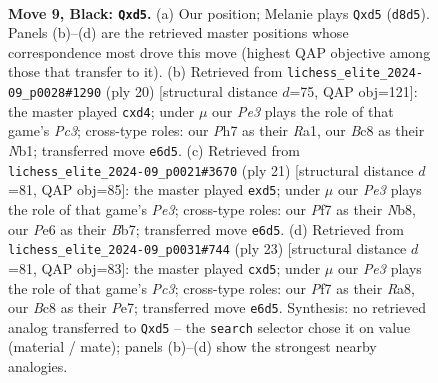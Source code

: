 \documentclass[11pt]{article}
\begin{document}
\clearpage

\begin{figure}[p]\centering
\begin{subfigure}{0.46\textwidth}\centering
\resizebox{\linewidth}{!}{%
\newchessgame
\chessboard[
  setfen={rnbq1rk1/pp3ppp/4p3/2pP3n/3P4/2PBPN2/P4PPP/R1BQ1RK1 b - - 0 9},
  showmover=false,
  pgfstyle=straightmove, color=movearrow, markmove={d8-d5}
]}
\caption{}
\end{subfigure}\hfill
\begin{subfigure}{0.46\textwidth}\centering
\resizebox{\linewidth}{!}{%
\newchessgame
\chessboard[
  setfen={r1bq1rk1/p3p1bp/2pp2pn/4Pp2/3p4/2P2N1P/PP3PP1/RNBQR1K1 w - - 0 11},
  showmover=false,
  pgfstyle=straightmove, color=movearrow, markmove={c3-d4}
]}
\caption{}
\end{subfigure}
\\[4pt]
\begin{subfigure}{0.46\textwidth}\centering
\resizebox{\linewidth}{!}{%
\newchessgame
\chessboard[
  setfen={rn1q1rk1/pb3ppp/1p1bp3/2pP4/3P1B2/2PBP3/P3NPPP/R2Q1RK1 b - - 0 11},
  showmover=false,
  pgfstyle=straightmove, color=movearrow, markmove={e6-d5}
]}
\caption{}
\end{subfigure}\hfill
\begin{subfigure}{0.46\textwidth}\centering
\resizebox{\linewidth}{!}{%
\newchessgame
\chessboard[
  setfen={rn1q1rk1/1p2ppbp/2p3p1/p1nP4/8/1PN1PP2/PB1PBP1P/R1Q1R1K1 b - - 0 12},
  showmover=false,
  pgfstyle=straightmove, color=movearrow, markmove={c6-d5}
]}
\caption{}
\end{subfigure}
\caption{\textbf{Move 9, Black: \texttt{Qxd5}.} (a) Our position; Melanie plays \texttt{Qxd5} (\texttt{d8d5}). Panels (b)--(d) are the retrieved master positions whose correspondence most drove this move (highest QAP objective among those that transfer to it). (b) Retrieved from \texttt{lichess\_elite\_2024-09\_p0028\#1290} (ply 20) [structural distance $d$=75, QAP obj=121]: the master played \texttt{cxd4}; under $\mu$ our \emph{Pe3} plays the role of that game's \emph{Pc3}; cross-type roles: our \emph{P}h7 as their \emph{R}a1, our \emph{B}c8 as their \emph{N}b1; transferred move \texttt{e6d5}. (c) Retrieved from \texttt{lichess\_elite\_2024-09\_p0021\#3670} (ply 21) [structural distance $d$=81, QAP obj=85]: the master played \texttt{exd5}; under $\mu$ our \emph{Pe3} plays the role of that game's \emph{Pe3}; cross-type roles: our \emph{P}f7 as their \emph{N}b8, our \emph{P}e6 as their \emph{B}b7; transferred move \texttt{e6d5}. (d) Retrieved from \texttt{lichess\_elite\_2024-09\_p0031\#744} (ply 23) [structural distance $d$=81, QAP obj=83]: the master played \texttt{cxd5}; under $\mu$ our \emph{Pe3} plays the role of that game's \emph{Pc3}; cross-type roles: our \emph{P}f7 as their \emph{R}a8, our \emph{B}c8 as their \emph{P}e7; transferred move \texttt{e6d5}. Synthesis: no retrieved analog transferred to \texttt{Qxd5} -- the \texttt{search} selector chose it on value (material / mate); panels (b)--(d) show the strongest nearby analogies.}
\label{fig:thought-m17}
\end{figure}
\end{document}
